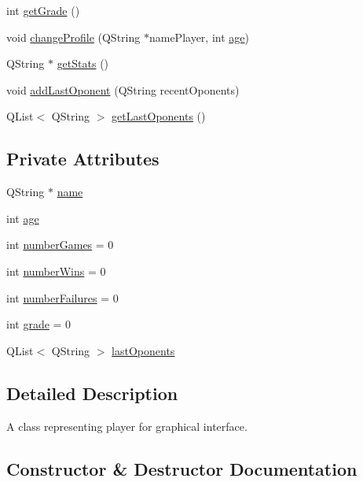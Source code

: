 \begin{DoxyCompactItemize}
\item 
int \hyperlink{classPlayer_a8320479b8d8233a1f9e97db652d228e9}{get\+Grade} ()
\item 
void \hyperlink{classPlayer_a37db9063f0dd514f2dc74a20fb4f5b71}{change\+Profile} (Q\+String $\ast$name\+Player, int \hyperlink{classPlayer_a91d98a856bbd96810b40af3ca5cc901a}{age})
\item 
Q\+String $\ast$ \hyperlink{classPlayer_aa4991dab5d59dfd37e9da17465e8dc52}{get\+Stats} ()
\item 
void \hyperlink{classPlayer_a67f249eb58bec9270d90245a97211d52}{add\+Last\+Oponent} (Q\+String recent\+Oponents)
\item 
Q\+List$<$ Q\+String $>$ \hyperlink{classPlayer_a6e0c06b360697a7f3fea19e5e1de37c3}{get\+Last\+Oponents} ()
\end{DoxyCompactItemize}
\subsection*{Private Attributes}
\begin{DoxyCompactItemize}
\item 
Q\+String $\ast$ \hyperlink{classPlayer_a4b7508f4b75dd810016635bb8a9ee1e3}{name}
\item 
int \hyperlink{classPlayer_a91d98a856bbd96810b40af3ca5cc901a}{age}
\item 
int \hyperlink{classPlayer_a1d6d057cd152c5d158546791cbd6bc8f}{number\+Games} = 0
\item 
int \hyperlink{classPlayer_a5490bb5e66c3e5ac702c7df4f363d57d}{number\+Wins} = 0
\item 
int \hyperlink{classPlayer_aeee09fe6d2b453144787ac2b70052d69}{number\+Failures} = 0
\item 
int \hyperlink{classPlayer_a13d4b9fff7f9b28844a348b444cff7be}{grade} = 0
\item 
Q\+List$<$ Q\+String $>$ \hyperlink{classPlayer_aa26e1577cdda5a121a83a7fb5dd4c985}{last\+Oponents}
\end{DoxyCompactItemize}


\subsection{Detailed Description}
A class representing player for graphical interface. 

\subsection{Constructor \& Destructor Documentation}
